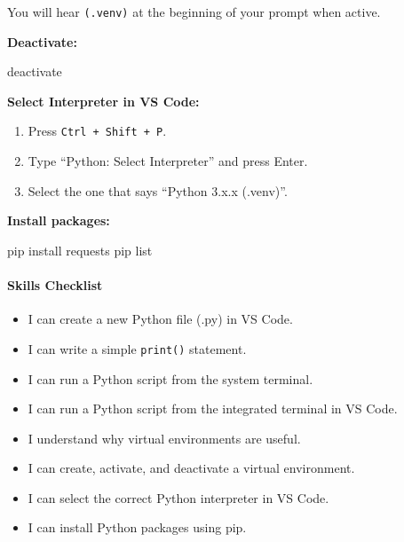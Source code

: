 \documentclass[
  justified,
  openright,
]{tufte-book}
\let\subsubsection\paragraph
\let\paragraph\paragraph
\newcommand{\ExtensionTok}[1]{#1}
\newcommand{\NormalTok}[1]{#1}
\newenvironment{Shaded}{%
  \begin{snugshade}
}{%
  \end{snugshade}
}
\let\subsubsection\paragraph
\let\paragraph\paragraph
\providecommand{\tightlist}{%
  \setlength{\itemsep}{0pt}\setlength{\parskip}{0pt}}
\begin{document}
You will hear \texttt{(.venv)} at the beginning of your prompt when
active.

\textbf{Deactivate:}

\begin{Shaded}
\begin{Highlighting}[]
\ExtensionTok{deactivate}
\end{Highlighting}
\end{Shaded}

\textbf{Select Interpreter in VS Code:}

\begin{enumerate}
\def\labelenumi{\arabic{enumi}.}
\tightlist
\item
  Press \texttt{Ctrl\ +\ Shift\ +\ P}.
\item
  Type ``Python: Select Interpreter'' and press Enter.
\item
  Select the one that says ``Python 3.x.x (.venv)''.
\end{enumerate}

\textbf{Install packages:}

\begin{Shaded}
\begin{Highlighting}[]
\ExtensionTok{pip}\NormalTok{ install requests}
\ExtensionTok{pip}\NormalTok{ list}
\end{Highlighting}
\end{Shaded}

\subsubsection{Skills Checklist}\label{skills-checklist-3}

\begin{itemize}
\tightlist
\item[$\square$]
  I can create a new Python file (.py) in VS Code.
\item[$\square$]
  I can write a simple \texttt{print()} statement.
\item[$\square$]
  I can run a Python script from the system terminal.
\item[$\square$]
  I can run a Python script from the integrated terminal in VS Code.
\item[$\square$]
  I understand why virtual environments are useful.
\item[$\square$]
  I can create, activate, and deactivate a virtual environment.
\item[$\square$]
  I can select the correct Python interpreter in VS Code.
\item[$\square$]
  I can install Python packages using pip.
\end{itemize}
\end{document}
